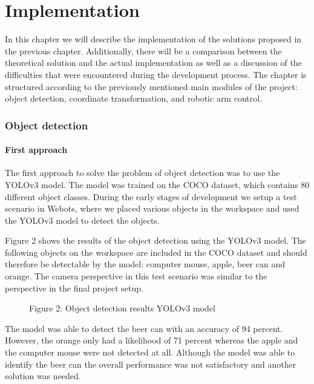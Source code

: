 
\chapter{Implementation} %

\label{implementation} %


In this chapter we will describe the implementation of the solutions proposed in the previous chapter. Additionally, there will be a comparison between the theoretical solution and the actual implementation as well as a discussion of the difficulties that were encountered during the development process. The chapter is structured according to the previously mentioned main modules of the project: object detection, coordinate transformation, and robotic arm control.
\subsection{Object detection}

\subsubsection{First approach}
The first approach to solve the problem of object detection was to use the YOLOv3 model. The model was trained on the COCO dataset, which contains 80 different object classes. During the early stages of development we setup a test scenario in Webots, where we placed various objects in the workspace and used the YOLOv3 model to detect the objects. 

Figure 2 shows the results of the object detection using the YOLOv3 model. The following objects on the workspace are included in the COCO dataset and should therefore be detectable by the model: computer mouse, apple, beer can and orange. The camera perspective in this test scenario was similar to the perspective in the final project setup.  

\begin{figure}[!htbp]
    \centering
    \caption{Figure 2: Object detection results YOLOv3 model }
\end{figure}


The model was able to detect the beer can with an accuracy of 94 percent. However, the orange only had a likelihood of 71 percent whereas the apple and the computer mouse were not detected at all. Although the model was able to identify the beer can the overall performance was not satisfactory and another solution was needed.

